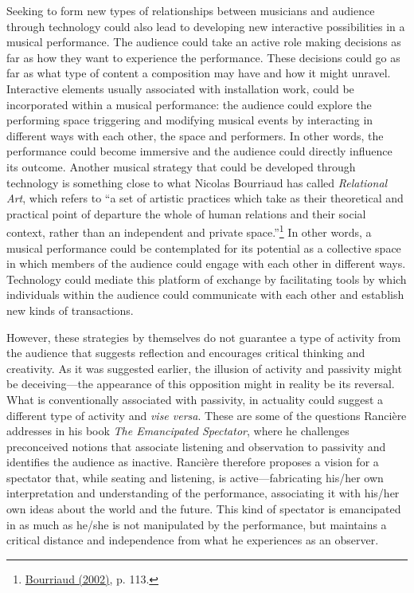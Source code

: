 Seeking to form new types of relationships between musicians and audience through technology could also lead to developing new interactive possibilities in a musical performance. The audience could take an active role making decisions as far as how they want to experience the performance. These decisions could go as far as what type of content a composition may have and how it might unravel. Interactive elements usually associated with installation work, could be incorporated within a musical performance: the audience could explore the performing space triggering and modifying musical events by interacting in different ways with each other, the space and performers. In other words, the performance could become immersive and the audience could directly influence its outcome. Another musical strategy that could be developed through technology is something close to what Nicolas Bourriaud has called \emph{Relational Art}, which refers to ``a set of artistic practices which take as their theoretical and practical point of departure the whole of human relations and their social context, rather than an independent and private space.''\footnote{\hyperlink{relational}{Bourriaud (2002)}, p. 113.} In other words, a musical performance could be contemplated for its potential as a collective space in which members of the audience could engage with each other in different ways. Technology could mediate this platform of exchange by facilitating tools by which individuals within the audience could communicate with each other and establish new kinds of transactions.

However, these strategies by themselves do not guarantee a type of activity from the audience that suggests reflection and encourages critical thinking and creativity. As it was suggested earlier, the illusion of activity and passivity might be deceiving---the appearance of this opposition might in reality be its reversal. What is conventionally associated with passivity, in actuality could suggest a different type of activity and \emph{vise versa}. These are some of the questions Ranci\`{e}re addresses in his book \emph{The Emancipated Spectator}, where he challenges preconceived notions that associate listening and observation to passivity and identifies the audience as inactive. Ranci\`{e}re therefore proposes a vision for a spectator that, while seating and listening, is active---fabricating his/her own interpretation and understanding of the performance, associating it with his/her own ideas about the world and the future. This kind of spectator is emancipated in as much as he/she is not manipulated by the performance, but maintains a critical distance and independence from what he experiences as an observer.

